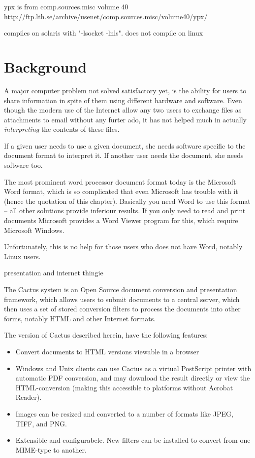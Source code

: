 ypx is from comp.sources.misc volume 40
http://ftp.lth.se/archive/usenet/comp.sources.misc/volume40/ypx/

compiles on solaris with "-lsocket -lnls".  does not compile on linux



\section{Background}

A major computer problem not solved satisfactory yet, is the ability
for users to share information in spite of them using different
hardware and software.   Even though the modern use of the Internet
allow any two users to exchange files as attachments to
email
without any furter ado, it has not helped much in actually \textit{interpreting} the
contents of these files.

If a given user needs to use a given document, she needs software
specific to the document format to interpret it.  If another user
needs the document, she needs software too.

The most prominent word processor document format today is the
Microsoft Word format, which is so complicated that even Microsoft has
trouble with it (hence the quotation of this chapter).  Basically you
need Word to use this format -- all other solutions provide inferiour
results.  If you only need to read and print documents Microsoft
provides a Word Viewer program for this, which require Microsoft
Windows.

Unfortunately, this is no help for those users who does not have Word,
notably Linux users.

\textsf{presentation and internet thingie}




The Cactus system is an Open Source document conversion and
presentation framework, which allows users to submit documents to a
central server, which then uses a set of stored conversion filters to
process the documents into other forms, notably HTML and other
Internet formats.

The version of Cactus described herein, have the following features:

\begin{itemize}
\item Convert documents to HTML versions viewable in a browser
\item Windows and Unix clients can use Cactus as a virtual PostScript
printer with automatic PDF conversion, and may download the result
directly or view the HTML-conversion (making this accessible to
platforms without Acrobat Reader).
  
\item Images can be resized and converted to a number of formats like
  JPEG, TIFF, and PNG.
\item Extensible and configurabele.  New filters can be installed to
  convert from one MIME-type to another. 
\end{itemize}


